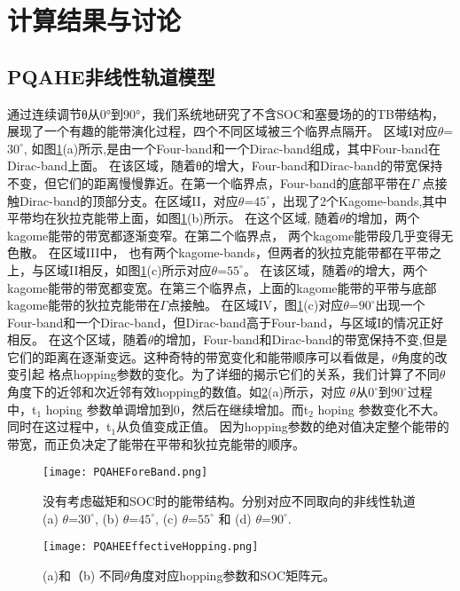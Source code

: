 \section{计算结果与讨论}

\subsection{PQAHE非线性轨道模型}
通过连续调节θ从0°到90°，我们系统地研究了不含SOC和塞曼场的的TB带结构，展现了一个有趣的能带演化过程，四个不同区域被三个临界点隔开。
区域I对应$\theta$=$30^\circ$, 如图\ref{PQAHEForeBand}(a)所示,是由一个Four-band和一个Dirac-band组成，其中Four-band在Dirac-band上面。
在该区域，随着θ的增大，Four-band和Dirac-band的带宽保持不变，但它们的距离慢慢靠近。在第一个临界点，Four-band的底部平带在$\Gamma$ 
点接触Dirac-band的顶部分支。在区域II，对应$\theta$=$45^\circ$，出现了2个Kagome-bands,其中平带均在狄拉克能带上面，如图\ref{PQAHEForeBand}(b)所示。
在这个区域,  随着$\theta$的增加，两个kagome能带的带宽都逐渐变窄。在第二个临界点， 两个kagome能带段几乎变得无色散。 在区域III中，
也有两个kagome-bands，但两者的狄拉克能带都在平带之上，与区域II相反，如图\ref{PQAHEForeBand}(c)所示对应$\theta$=$55^\circ$。  
在该区域，随着$\theta$的增大，两个kagome能带的带宽都变宽。在第三个临界点，上面的kagome能带的平带与底部kagome能带的狄拉克能带在$\Gamma$点接触。
在区域IV，图\ref{PQAHEForeBand}(c)对应$\theta$=$90^\circ$出现一个Four-band和一个Dirac-band，但Dirac-band高于Four-band，与区域I的情况正好相反。
在这个区域，随着$\theta$的增加，Four-band和Dirac-band的带宽保持不变,但是它们的距离在逐渐变远。这种奇特的带宽变化和能带顺序可以看做是，$\theta$角度的改变引起
格点hopping参数的变化。为了详细的揭示它们的关系，我们计算了不同$\theta$角度下的近邻和次近邻有效hopping的数值。如\ref{PQAHEEffectiveHopping}(a)所示，对应
$\theta$从$0^\circ$到$90^\circ$过程中，t$_1$ hoping 参数单调增加到0，然后在继续增加。而t$_2$ hoping 参数变化不大。同时在这过程中，t$_1$从负值变成正值。
因为hopping参数的绝对值决定整个能带的带宽，而正负决定了能带在平带和狄拉克能带的顺序。

\begin{figure}[htb]
  \centering
  \texttt{[image: PQAHEForeBand.png]}
  \caption{没有考虑磁矩和SOC时的能带结构。分别对应不同取向的非线性轨道 (a) $\theta$=$30^\circ$, (b) $\theta$=$45^\circ$, 
  (c) $\theta$=$55^\circ$ 和 (d) $\theta$=$90^\circ$.} 
  \label{PQAHEForeBand}
  \note{}
\end{figure}

\begin{figure}[htb]
  \centering
  \texttt{[image: PQAHEEffectiveHopping.png]}
  \caption{(a)和（b) 不同$\theta$角度对应hopping参数和SOC矩阵元。} 
  \label{PQAHEEffectiveHopping}
  \note{}
\end{figure}


